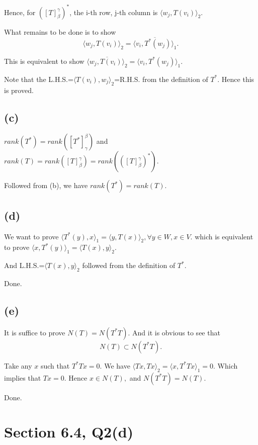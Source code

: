 \documentclass[12pt]{article}%
\begin{document}
Hence, for $([T]_{\beta}^{\gamma})^*$, the i-th row, j-th column is $\langle w_j,T(v_i) \rangle_2$.

What remains to be done is to show $$\langle w_j,T(v_i) \rangle_2 = \overline{\langle v_i,T^*(w_j) \rangle_1}.$$

This is equivalent to show $\overline{\langle w_j,T(v_i) \rangle_2} = \langle v_i,T^*(w_j) \rangle_1.$

Note that the L.H.S.=$\langle T(v_i),w_j \rangle_2$=R.H.S. from the definition of $T^*.$ Hence this is proved.

\subsection{(c)}

$rank(T^*)=rank([T^*]_\gamma^{\beta})$ and $rank(T)=rank([T]_\beta^{\gamma})=rank(([T]_\beta^{\gamma})^*).$

Followed from (b), we have $rank(T^*)=rank(T).$

\subsection{(d)}
We want to prove $\langle T^*(y),x \rangle_1=\langle y,T(x) \rangle_2, \forall y\in W, x \in V.$ 
which is equivalent to prove $\langle x, T^*(y) \rangle_1=\langle T(x),y \rangle_2$.

And L.H.S.=$\langle T(x),y \rangle_2$ followed from the definition of $T^*$.

Done.

\subsection{(e)}
It is suffice to prove $N(T)=N(T^*T).$ And it is obvious to see that $$N(T) \subset N(T^*T).$$

Take any $x$ such that $T^*Tx = 0.$ We have $\langle Tx,Tx \rangle_2=\langle x,T^*Tx \rangle_1=0.$ 
Which implies that $Tx=0.$ Hence $x \in N(T),$ and $N(T^*T)=N(T).$

Done.

\section{Section 6.4, Q2(d)}
\end{document}
